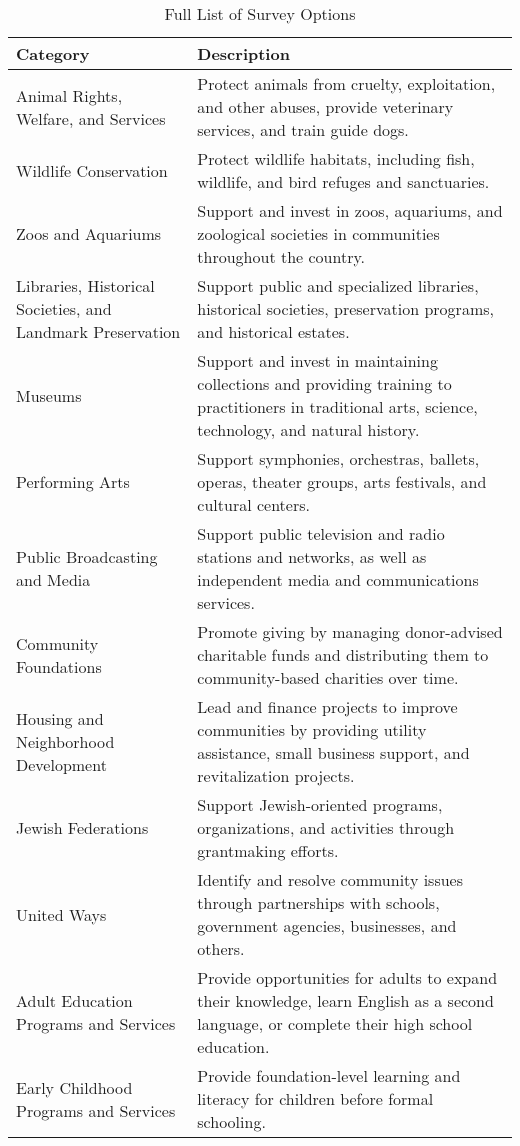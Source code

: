 \begin{table}[h!]
\centering
\caption{Full List of Survey Options}
\label{tab:optionsList}
\begin{tabular}{p{5cm} p{10cm}}
\toprule
\textbf{Category} & \textbf{Description} \\
\midrule
Animal Rights, Welfare, and Services & Protect animals from cruelty, exploitation, and other abuses, provide veterinary services, and train guide dogs. \\
Wildlife Conservation & Protect wildlife habitats, including fish, wildlife, and bird refuges and sanctuaries. \\
Zoos and Aquariums & Support and invest in zoos, aquariums, and zoological societies in communities throughout the country. \\
Libraries, Historical Societies, and Landmark Preservation & Support public and specialized libraries, historical societies, preservation programs, and historical estates. \\
Museums & Support and invest in maintaining collections and providing training to practitioners in traditional arts, science, technology, and natural history. \\
Performing Arts & Support symphonies, orchestras, ballets, operas, theater groups, arts festivals, and cultural centers. \\
Public Broadcasting and Media & Support public television and radio stations and networks, as well as independent media and communications services. \\
Community Foundations & Promote giving by managing donor-advised charitable funds and distributing them to community-based charities over time. \\
Housing and Neighborhood Development & Lead and finance projects to improve communities by providing utility assistance, small business support, and revitalization projects. \\
Jewish Federations & Support Jewish-oriented programs, organizations, and activities through grantmaking efforts. \\
United Ways & Identify and resolve community issues through partnerships with schools, government agencies, businesses, and others. \\
Adult Education Programs and Services & Provide opportunities for adults to expand their knowledge, learn English as a second language, or complete their high school education. \\
Early Childhood Programs and Services & Provide foundation-level learning and literacy for children before formal schooling. \\

\end{tabular}
\end{table}
